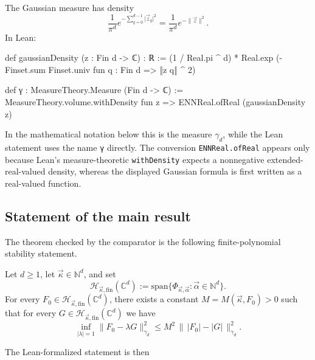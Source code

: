 \documentclass[11pt]{amsart}
\newcommand{\inlean}[1]{{\scriptsize \texttt{#1}}}
\theoremstyle{remark}
\newcommand{\C}{\mathbb{C}}
\newcommand{\N}{\mathbb{N}}
\newcommand{\abs}[1]{\lvert #1 \rvert}
\begin{document}
The Gaussian measure has density
\[
\frac{1}{\pi^d}e^{-\sum_{q=0}^{d-1}\abs{\vec z_q}^2}
= \frac{1}{\pi^d}e^{-\lVert \vec z\rVert^2}.
\]
In Lean:
\begin{leancode}
def gaussianDensity (z : Fin d -> ℂ) : ℝ :=
  (1 / Real.pi ^ d) *
    Real.exp (-Finset.sum Finset.univ fun q : Fin d => ‖z q‖ ^ 2)

def γ : MeasureTheory.Measure (Fin d -> ℂ) :=
  MeasureTheory.volume.withDensity fun z => ENNReal.ofReal (gaussianDensity z)
\end{leancode}
In the mathematical notation below this is the measure $\gamma_d$, while the Lean
statement uses the name {\inlean{γ}} directly.  The conversion
{\inlean{ENNReal.ofReal}} appears only because Lean's measure-theoretic
{\inlean{withDensity}} expects a nonnegative extended-real-valued density,
whereas the displayed Gaussian formula is first written as a real-valued
function. 

\subsection{Statement of the main result}

The theorem checked by the comparator is the following finite-polynomial
stability statement.
\begin{theorem*}
Let $d\geq 1$, let $\vec\kappa\in\N^d$, and set
\[
    \mathcal H_{\vec\kappa,\mathrm{fin}}(\C^d)
    :=
    \mathrm{span}\{\Phi_{\vec\kappa,\vec\alpha}:\vec\alpha\in\N^d\}.
\]
For every $F_0\in \mathcal H_{\vec\kappa,\mathrm{fin}}(\C^d)$, there exists a
constant $M=M(\vec\kappa,F_0)>0$ such that for every
$G\in\mathcal H_{\vec\kappa,\mathrm{fin}}(\C^d)$ we have
\[
\inf_{|\lambda|=1}\lVert F_0-\lambda G\rVert_{\gamma_d}^2
\le
M^2\,\bigl\|\, \lvert F_0\rvert-\lvert G\rvert\,\bigr\|_{\gamma_d}^2.
\]
\end{theorem*}
The Lean-formalized statement is then
\end{document}
